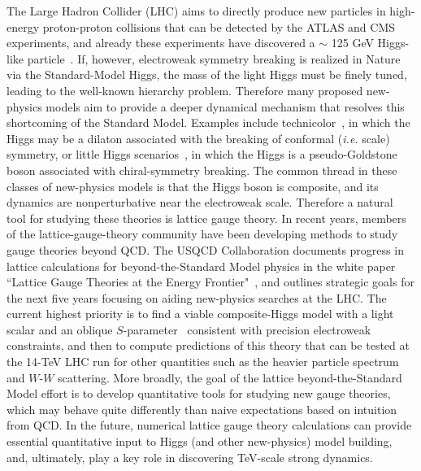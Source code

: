 The Large Hadron Collider (LHC) aims to directly produce new particles in high-energy proton-proton collisions that can be detected by the ATLAS and CMS experiments, and already these experiments have discovered a $\sim$ 125 GeV Higgs-like particle~\cite{Aad:2012tfa,Chatrchyan:2012ufa}.   If, however, electroweak symmetry breaking is realized in Nature via the Standard-Model Higgs, the mass of the light Higgs must be finely tuned, leading to the well-known hierarchy problem.   Therefore many proposed new-physics models aim to provide a deeper dynamical mechanism that resolves this shortcoming of the Standard Model.  Examples include technicolor~\cite{Farhi:1980xs,Hill:2002ap}, in which the Higgs may be a dilaton associated with the breaking of conformal ({\it i.e.} scale) symmetry, or little Higgs scenarios~\cite{Kaplan:1983sm,ArkaniHamed:2002pa,ArkaniHamed:2002qy}, in which the Higgs is a pseudo-Goldstone boson associated with chiral-symmetry breaking.  The common thread in these classes of new-physics models is that the Higgs boson is composite, and its dynamics are nonperturbative near the electroweak scale.  Therefore a natural tool for studying these theories is lattice gauge theory.   In recent years, members of the lattice-gauge-theory community have been developing methods to study gauge theories beyond QCD.  The USQCD Collaboration documents progress in lattice calculations for beyond-the-Standard Model physics in the white paper ``Lattice Gauge Theories at the Energy Frontier"~\cite{USQCD_EF_whitepaper13}, and outlines strategic goals for the next five years focusing on aiding new-physics searches at the LHC.  The current highest priority is to find a viable composite-Higgs model with a light scalar and an oblique $S$-parameter~\cite{Peskin:1990zt} consistent with precision electroweak constraints, and then to compute predictions of this theory that can be tested at the 14-TeV LHC run for other quantities such as the heavier particle spectrum and $W$-$W$ scattering.  More broadly, the goal of the lattice beyond-the-Standard Model effort is to develop quantitative tools for studying new gauge theories, which may behave quite differently than naive expectations based on intuition from QCD.  In the future, numerical lattice gauge theory calculations can provide essential quantitative input to Higgs (and other new-physics) model building, and, ultimately, play a key role in discovering TeV-scale strong dynamics. 

